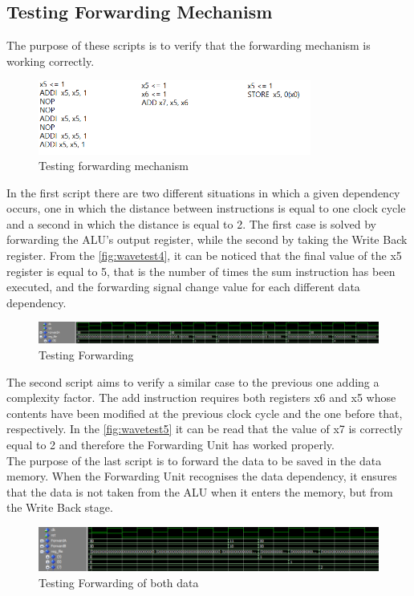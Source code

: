 \subsection{Testing Forwarding Mechanism}
The purpose of these scripts is to verify that the forwarding mechanism is working correctly. 
\begin{figure}[H]
	\centering
	\includegraphics[width=0.8\textwidth]{sec3/images/test456.png}
	\caption{Testing forwarding mechanism}
	\label{fig:test456}
\end{figure}
\noindent In the first script there are two different situations in which a given dependency occurs, one in which the distance between instructions is equal to one clock cycle and a second in which the distance is equal to 2. The first case is solved by forwarding the ALU's output register, while the second by taking the Write Back register. From the \autoref{fig:wavetest4}, it can be noticed that the final value of the x5 register is equal to 5, that is the number of times the sum instruction has been executed, and the forwarding signal change value for each different data dependency.
\begin{figure}[H]
	\centering
	\includegraphics[width=1\textwidth]{sec3/images/wave_test4.png}
	\caption{Testing Forwarding}
	\label{fig:wavetest4}
\end{figure}
\noindent The second script aims to verify a similar case to the previous one adding a complexity factor. The add instruction requires both registers x6 and x5 whose contents have been modified at the previous clock cycle and the one before that, respectively. In the \autoref{fig:wavetest5} it can be read that the value of x7 is correctly equal to 2 and therefore the Forwarding Unit has worked properly.\\
The purpose of the last script is to forward the data to be saved in the data memory. When the Forwarding Unit recognises the data dependency, it ensures that the data is not taken from the ALU when it enters the memory, but from the Write Back stage.
\begin{figure}[H]
	\centering
	\includegraphics[width=1\textwidth]{sec3/images/wave_test5.png}
	\caption{Testing Forwarding of both data}
	\label{fig:wavetest5}
\end{figure}
